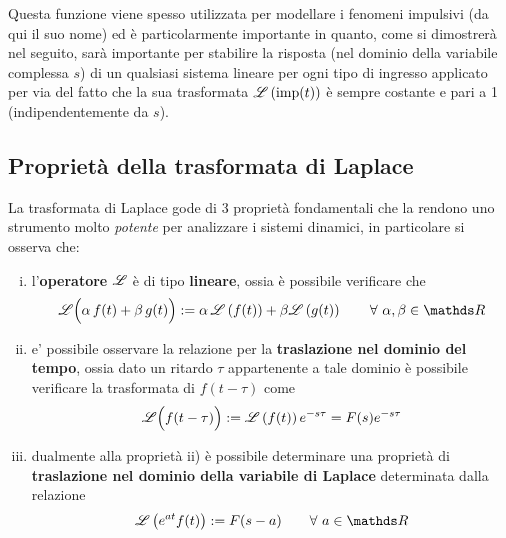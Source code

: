 	Questa funzione viene spesso utilizzata per modellare i fenomeni impulsivi (da qui il suo nome) ed è particolarmente importante in quanto, come si dimostrerà nel seguito, sarà importante per stabilire la risposta (nel dominio della variabile complessa $s$) di un qualsiasi sistema lineare per ogni tipo di ingresso applicato per via del fatto che la sua trasformata $\mathscr L \left( \textrm{imp}(t) \right)$ è sempre costante e pari a 1 (indipendentemente da $s$).
	
	
	\subsection{Proprietà della trasformata di Laplace}
	    La trasformata di Laplace gode di 3 proprietà fondamentali che la rendono uno strumento molto \textit{potente} per analizzare i sistemi dinamici, in particolare si osserva che:
	    \begin{enumerate}[i)]
	        \item l'\textbf{operatore} $\mathscr L$ è di tipo \textbf{lineare}, ossia è possibile verificare che
	        \begin{equation}
	            \L\Big( \alpha\, f(t) + \beta\, g(t)\Big) := \alpha\, \trasf{f(t)} + \beta \trasf{g(t)} \qquad \forall \ \alpha,\beta\in\mathds R 
	        \end{equation}
	        
	        \item e' possibile osservare la relazione per la \textbf{traslazione nel dominio del tempo}, ossia dato un ritardo $\tau$ appartenente a tale dominio è possibile verificare la trasformata di $f(t-\tau)$ come
	        \begin{equation} \label{eq:class:proptraslazionetempo}
	            \mathscr L \Big( f(t-\tau)\Big) := \mathscr L \left( f(t) \right) e^{-s\tau} = F(s) e^{-s\tau} 
	        \end{equation}
	        
	        \item dualmente alla proprietà ii) è possibile determinare una proprietà di \textbf{traslazione nel dominio della variabile di Laplace} determinata dalla relazione
	        \begin{equation}
	            \trasf{e^{at} f(t) } := F(s-a) \qquad \forall \ a \in \mathds R
	        \end{equation}
	        
	    \end{enumerate}
	
